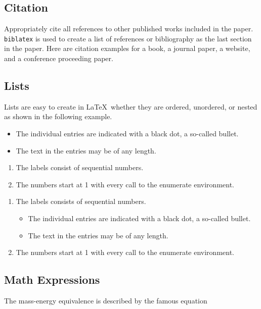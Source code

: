 \documentclass{article}
\begin{document}
\subsection{Citation}
Appropriately cite all references to other published works included in the paper. \texttt{biblatex} is used to create a list of references or bibliography as the last section in the paper. Here are citation examples for a book\cite{latexcompanion}, a journal paper\cite{einstein}, a website\cite{knuthwebsite}, and a conference proceeding paper\cite{maurer}.

\subsection{Lists}
Lists are easy to create in  \LaTeX\ whether they are ordered, unordered, or nested as shown in the following example.

\begin{itemize}[noitemsep]
  \item The individual entries are indicated with a black dot, a so-called bullet.
  \item The text in the entries may be of any length.
\end{itemize}

\begin{enumerate}[noitemsep]
  \item The labels consist of sequential numbers.
  \item The numbers start at 1 with every call to the enumerate environment.
\end{enumerate}

\begin{enumerate}[noitemsep]
   \item The labels consists of sequential numbers.
   \begin{itemize}[noitemsep]
     \item The individual entries are indicated with a black dot, a so-called bullet.
     \item The text in the entries may be of any length.
   \end{itemize}
   \item The numbers start at 1 with every call to the enumerate environment.
\end{enumerate}

\subsection{Math Expressions}
The mass-energy equivalence is described by the famous equation
\end{document}
